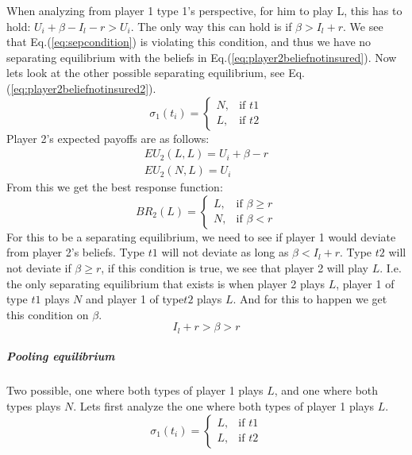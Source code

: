 When analyzing from player 1 type 1's perspective, for him to play L, this has to hold: $U_{i}+\beta-I_{l}-r > U_{i}$. The only way this can hold is if $\beta>I_{l}+r$. We see that Eq.(\ref{eq:sepcondition}) is violating this condition, and thus we have no separating equilibrium with the beliefs in Eq.(\ref{eq:player2beliefnotinsured}).
Now lets look at the other possible separating equilibrium, see Eq.(\ref{eq:player2beliefnotinsured2}).
\begin{equation}
    \sigma_{1}(t_{i})= 
\begin{cases}
   N,& \text{if } t1\\
   L,& \text{if } t2  
\end{cases}
\label{eq:player2beliefnotinsured2}
\end{equation}
Player 2's expected payoffs are as follows:
\begin{eqnarray}
EU_{2}(L,L)=U_{i}+\beta-r \\
EU_{2}(N,L)=U_{i}
\end{eqnarray}
From this we get the best response function:
\begin{equation}
BR_{2}(L)=
\begin{cases}
L ,& \text{if } \beta\geq r \\
N ,& \text{if } \beta<r 
\end{cases}
\end{equation}
For this to be a separating equilibrium, we need to see if player 1 would deviate from player 2's beliefs. 
Type $t1$ will not deviate as long as $\beta<I_{l}+r$. Type $t2$ will not deviate if $\beta \geq r$, if this condition is true, we see that player 2 will play $L$. I.e. the only separating equilibrium that exists is when player 2 plays $L$, player 1 of type $t1$ plays $N$ and player 1 of type$t2$ plays $L$.
And for this to happen we get this condition on $\beta$. \begin{equation}
I_{l}+r>\beta>r
\label{eq:conditionseparatingequilibrium}
\end{equation}
\subparagraph{Pooling equilibrium}
Two possible, one where both types of player 1 plays $L$, and one where both types plays $N$. Lets first analyze the one where both types of player 1 plays $L$.
\begin{equation}
    \sigma_{1}(t_{i})= 
\begin{cases}
   L,& \text{if } t1\\
   L,& \text{if } t2  
\end{cases}
\label{eq:player2beliefnotinsuredpooling}
\end{equation}
